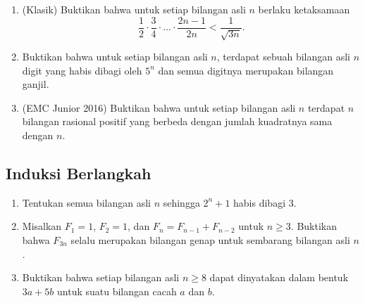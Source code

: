 \documentclass[12pt]{scrartcl}
\begin{document}
\begin{enumerate}
	\item (Klasik)
	Buktikan bahwa untuk setiap bilangan asli $n$ berlaku ketaksamaan
	\[ \frac{1}{2} \cdot \frac{3}{4} \cdot \dots \cdot \frac{2n-1}{2n}
	< \frac{1}{\sqrt{3n}}. \]

	\item 
	Buktikan bahwa untuk setiap bilangan asli $n$,
	terdapat sebuah bilangan asli $n$ digit yang habis dibagi oleh $5^n$
	dan semua digitnya merupakan bilangan ganjil.

	\item (EMC Junior 2016)
	Buktikan bahwa untuk setiap bilangan asli $n$ terdapat $n$ bilangan
	rasional positif yang berbeda dengan jumlah kuadratnya sama dengan $n$.

\end{enumerate}

\subsection{Induksi Berlangkah}
\begin{enumerate}[resume]

	\item Tentukan semua bilangan asli $n$ sehingga $2^n + 1$ habis dibagi $3$.

	\item 
	Misalkan $F_1 = 1$, $F_2 = 1$, dan $F_n = F_{n-1} + F_{n-2}$ untuk $n \ge 3$.
	Buktikan bahwa $F_{3n}$ selalu merupakan bilangan genap
	untuk sembarang bilangan asli $n$.

	\item Buktikan bahwa setiap bilangan asli $n \ge 8$ dapat dinyatakan
	dalam bentuk $3a + 5b$ untuk suatu bilangan cacah $a$ dan $b$.

\end{enumerate}
\end{document}

